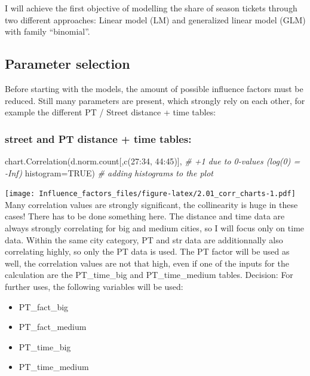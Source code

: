 \documentclass[
]{article}
\newenvironment{Shaded}{\begin{snugshade}}{\end{snugshade}}
\newcommand{\AttributeTok}[1]{\textcolor[rgb]{0.77,0.63,0.00}{#1}}
\newcommand{\CommentTok}[1]{\textcolor[rgb]{0.56,0.35,0.01}{\textit{#1}}}
\newcommand{\ConstantTok}[1]{\textcolor[rgb]{0.00,0.00,0.00}{#1}}
\newcommand{\DecValTok}[1]{\textcolor[rgb]{0.00,0.00,0.81}{#1}}
\newcommand{\FunctionTok}[1]{\textcolor[rgb]{0.00,0.00,0.00}{#1}}
\newcommand{\NormalTok}[1]{#1}
\newcommand{\SpecialCharTok}[1]{\textcolor[rgb]{0.00,0.00,0.00}{#1}}
\providecommand{\tightlist}{%
  \setlength{\itemsep}{0pt}\setlength{\parskip}{0pt}}
\begin{document}
I will achieve the first objective of modelling the share of season
tickets through two different approaches: Linear model (LM) and
generalized linear model (GLM) with family ``binomial''.

\hypertarget{parameter-selection}{%
\subsection{Parameter selection}\label{parameter-selection}}

Before starting with the models, the amount of possible influence
factors must be reduced. Still many parameters are present, which
strongly rely on each other, for example the different PT / Street
distance + time tables:

\hypertarget{street-and-pt-distance-time-tables}{%
\subsubsection{street and PT distance + time
tables:}\label{street-and-pt-distance-time-tables}}

\begin{Shaded}
\begin{Highlighting}[]
\FunctionTok{chart.Correlation}\NormalTok{(d.norm.count[,}\FunctionTok{c}\NormalTok{(}\DecValTok{27}\SpecialCharTok{:}\DecValTok{34}\NormalTok{, }\DecValTok{44}\SpecialCharTok{:}\DecValTok{45}\NormalTok{)], }\CommentTok{\# +1 due to 0{-}values (log(0) = {-}Inf)}
                  \AttributeTok{histogram=}\ConstantTok{TRUE}\NormalTok{) }\CommentTok{\# adding histograms to the plot}
\end{Highlighting}
\end{Shaded}

\texttt{[image: Influence\_factors\_files/figure-latex/2.01\_corr\_charts-1.pdf]}
Many correlation values are strongly significant, the collinearity is
huge in these cases! There has to be done something here. The distance
and time data are always strongly correlating for big and medium cities,
so I will focus only on time data. Within the same city category, PT and
str data are additionnally also correlating highly, so only the PT data
is used. The PT factor will be used as well, the correlation values are
not that high, even if one of the inputs for the calculation are the
PT\_time\_big and PT\_time\_medium tables. Decision: For further uses,
the following variables will be used:

\begin{itemize}
\tightlist
\item
  PT\_fact\_big
\item
  PT\_fact\_medium
\item
  PT\_time\_big
\item
  PT\_time\_medium
\end{itemize}
\end{document}
